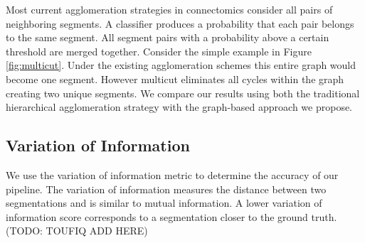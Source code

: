 Most current agglomeration strategies in connectomics consider all pairs of neighboring segments. A classifier produces a probability that each pair belongs to the same segment. All segment pairs with a probability above a certain threshold are merged together. Consider the simple example in Figure \ref{fig:multicut}. Under the existing agglomeration schemes this entire graph would become one segment. However multicut eliminates all cycles within the graph creating two unique segments. We compare our results using both the traditional hierarchical agglomeration strategy with the graph-based approach we propose. 

\subsection{Variation of Information}

We use the variation of information metric to determine the accuracy of our pipeline. The variation of information measures the distance between two segmentations and is similar to mutual information. A lower variation of information score corresponds to a segmentation closer to the ground truth. (TODO: TOUFIQ ADD HERE)










